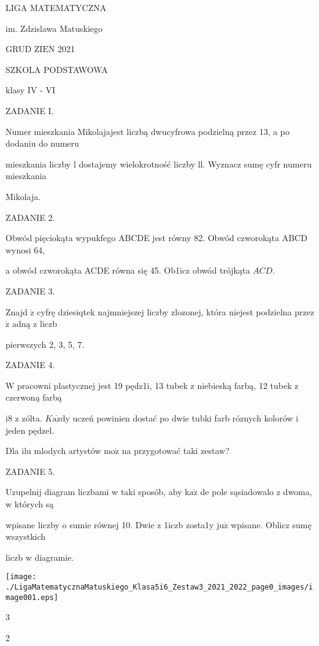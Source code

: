 \documentclass[a4paper,12pt]{article}
\begin{document}
LIGA MATEMATYCZNA

im. Zdzislawa Matuskiego

GRUD Z$\mathrm{I}\mathrm{E}\acute{\mathrm{N}}$ 2021

SZKOLA PODSTAWOWA

klasy IV - VI

ZADANIE I.

Numer mieszkania Mikolajajest liczbą dwucyfrowa podzielną przez 13, a po dodaniu do numeru

mieszkania liczby l dostajemy wielokrotność liczby ll. Wyznacz sumę cyfr numeru mieszkania

Mikolaja.

ZADANIE 2.

Obwód pięciokąta wypukfego ABCDE jest równy 82. Obwód czworokąta ABCD wynosi 64,

a obwód czworokąta ACDE równa się 45. Ob1icz obwód trójkąta $ACD.$

ZADANIE 3.

Znajd $\acute{\mathrm{z}}$ cyfrę dziesiqtek najmniejszej liczby zlozonej, która niejest podzielna przez $\dot{\mathrm{z}}$ adną z liczb

pierwszych 2, 3, 5, 7.

ZADANIE 4.

$\mathrm{W}$ pracowni plastycznej jest 19 pędz1i, 13 tubek z niebieską farbą, 12 tubek z czerwoną farbą

$\mathrm{i}8$ z zólta. $K\mathrm{a}\dot{\mathrm{z}}\mathrm{d}\mathrm{y}$ uczeń powinien dostać po dwie tubki farb róznych kolorów i jeden pędzel.

Dla ilu mlodych artystów $\mathrm{m}\mathrm{o}\dot{\mathrm{z}}$ na przygotować taki zestaw?

ZADANIE 5.

Uzupelnij diagram liczbami w taki sposób, aby $\mathrm{k}\mathrm{a}\dot{\mathrm{z}}$ de pole sąsiadowalo z dwoma, w których są

wpisane liczby o sumie równej 10. Dwie z 1iczb zosta1y $\mathrm{j}\mathrm{u}\dot{\mathrm{z}}$ wpisane. Oblicz sumę wszystkich

liczb w diagramie.
\begin{center}
\texttt{[image: ./LigaMatematycznaMatuskiego\_Klasa5i6\_Zestaw3\_2021\_2022\_page0\_images/image001.eps]}
\end{center}
3

2
\end{document}
